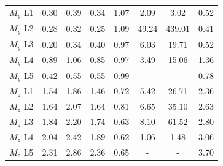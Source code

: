 \begin{table}[h]
\begin{tabular}{lccccccc}
$M_y$ L1 & 0.30 & 0.39 & 0.34 & 1.07 & 2.09 & 3.02 & 0.52 \\
$M_y$ L2 & 0.28 & 0.32 & 0.25 & 1.09 & 49.24 & 439.01 & 0.41 \\
$M_y$ L3 & 0.20 & 0.34 & 0.40 & 0.97 & 6.03 & 19.71 & 0.52 \\
$M_y$ L4 & 0.89 & 1.06 & 0.85 & 0.97 & 3.49 & 15.06 & 1.36 \\
$M_y$ L5 & 0.42 & 0.55 & 0.55 & 0.99 & - & - & 0.78 \\
$M_z$ L1 & 1.54 & 1.86 & 1.46 & 0.72 & 5.42 & 26.71 & 2.36 \\
$M_z$ L2 & 1.64 & 2.07 & 1.64 & 0.81 & 6.65 & 35.10 & 2.63 \\
$M_z$ L3 & 1.84 & 2.20 & 1.74 & 0.63 & 8.10 & 61.52 & 2.80 \\
$M_z$ L4 & 2.04 & 2.42 & 1.89 & 0.62 & 1.06 & 1.48 & 3.06 \\
$M_z$ L5 & 2.31 & 2.86 & 2.36 & 0.65 & - & - & 3.70 \\
\bottomrule
\end{tabular}
\end{table}
